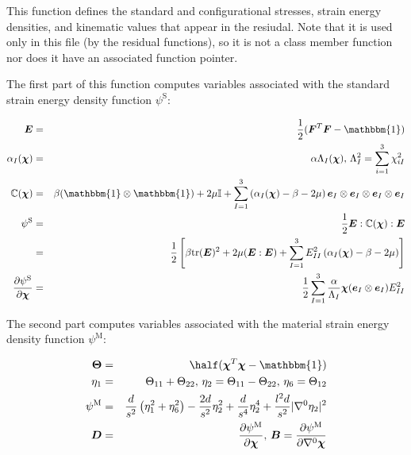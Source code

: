 This function defines the standard and configurational stresses, strain energy densities, and kinematic values that appear in the resiudal. Note that it is used only in this file (by the {\ttfamily residual} functions), so it is not a class member function nor does it have an associated function pointer.


\begin{DoxyCodeInclude}

\end{DoxyCodeInclude}


The first part of this function computes variables associated with the standard strain energy density function $\psi^\mathrm{S}$\-:

\begin{eqnarray*} \boldsymbol{E} &=& \frac{1}{2}(\boldsymbol{F}^T\boldsymbol{F} - \mathbbm{1})\\ \alpha_I(\boldsymbol{\chi}) &=& \alpha\Lambda_I(\boldsymbol{\chi}), \, \Lambda_I^2 = \sum_{i=1}^3\chi_{iI}^2\\ \mathbb{C}(\boldsymbol{\chi}) &=& \beta(\mathbbm{1}\otimes\mathbbm{1}) + 2\mu\mathbb{I} + \sum_{I=1}^3 \left(\alpha_I(\boldsymbol{\chi}) -\beta - 2\mu \right) \boldsymbol{e}_I\otimes \boldsymbol{e}_I\otimes\boldsymbol{e}_I\otimes \boldsymbol{e}_I\\ \psi^\mathrm{S} &=& \frac{1}{2} \boldsymbol{E}:\mathbb{C}(\boldsymbol{\chi}):\boldsymbol{E} \\ &=& \frac{1}{2}\left[\beta\mathrm{tr}(\boldsymbol{E})^2 + 2\mu(\boldsymbol{E}:\boldsymbol{E}) + \sum_{I=1}^3 E_{II}^2\left(\alpha_I(\boldsymbol{\chi}) -\beta - 2\mu \right) \right]\\ \frac{\partial \psi^\mathrm{S}}{\partial \boldsymbol{\chi}} &=& \frac{1}{2} \sum_{I=1}^3 \frac{\alpha}{\Lambda_I}\boldsymbol{\chi}(\boldsymbol{e}_I\otimes \boldsymbol{e}_I) E_{II}^2 \end{eqnarray*}


\begin{DoxyCodeInclude}

\end{DoxyCodeInclude}


The second part computes variables associated with the material strain energy density function $\psi^\mathrm{M}$\-:

\begin{eqnarray*} \boldsymbol{\Theta} &=& \half(\boldsymbol{\chi}^T\boldsymbol{\chi} - \mathbbm{1})\\ \eta_1 &=& \Theta_{11} + \Theta_{22},\, \eta_2 = \Theta_{11} - \Theta_{22},\, \eta_6 = \Theta_{12}\\ \psi^\mathrm{M} &=& \frac{d}{s^2}\left(\eta_1^2 + \eta_6^2\right) -\frac{2d}{s^2}\eta_2^2 + \frac{d}{s^4}\eta_2^4 + \frac{l^2d}{s^2}|\nabla^0 \eta_2|^2\\ \boldsymbol{D} &=& \frac{\partial \psi^\mathrm{M}}{\partial \boldsymbol{\chi}},\, \boldsymbol{B} = \frac{\partial \psi^\mathrm{M}}{\partial \nabla^0\boldsymbol{\chi}}\\ \end{eqnarray*}


